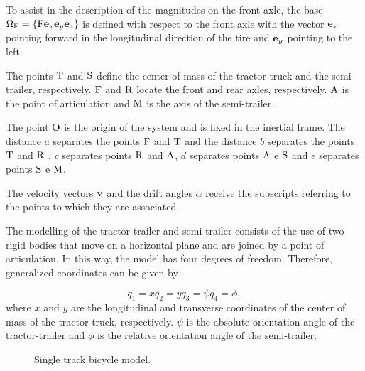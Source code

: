 \documentclass[sublist]{fei}
\begin{document}
To assist in the description of the magnitudes on the front axle, the base \( \Omega_{\rm F} = \{ {\rm F} {\bf e}_x {\bf e}_y {\bf e}_z \}\)  is defined with respect to the front axle with the vector  \({\bf e}_x\)pointing forward in the longitudinal direction of the tire and \({\bf e}_y\) pointing to the left.

The points  \({\rm T}\) and \({\rm S}\)  define the center of mass of the tractor-truck and the semi-trailer, respectively. \({\rm F}\) and \({\rm R}\) locate the front and rear axles, respectively. \({\rm A}\)  is the point of articulation and \({\rm M}\) is the axis of the semi-trailer.

The point \({\rm O}\) is the origin of the system and is fixed in the inertial frame. The distance \(a\) separates the points \({\rm F}\) and \({\rm T}\)  and the distance  \(b\) separates the points \({\rm T}\) and \({\rm R}\) .  \(c\) separates points \({\rm R}\) and \({\rm A}\), \(d\) separates points \({\rm A}\) e \({\rm S}\) and  \(e\) separates points \({\rm S}\) e \({\rm M}\). 


The velocity vectors  \({\bf v}\)  and the drift angles \(\alpha\) receive the subscripts referring to the points to which they are associated.
	
The modelling of the tractor-trailer and semi-trailer consists of the use of two rigid bodies that move on a horizontal plane and are joined by a point of articulation. In this way, the model has four degrees of freedom. Therefore, generalized coordinates can be given by

\begin{subequations}
\begin{equation}
    q_1 = x
\end{equation}
\begin{equation}
    q_2 = y
\end{equation}
\begin{equation}
    q_3 = \psi
\end{equation}
\begin{equation}
    q_4 = \phi,
\end{equation}
\end{subequations}
where \(x \) and \(y \) are the longitudinal and transverse coordinates of the center of mass of the tractor-truck, respectively. \(\psi \) is the absolute orientation angle of the tractor-trailer and \(\phi \) is the relative orientation angle of the semi-trailer.
\begin{figure}
    \begin{center}
    \caption{Single track bicycle model.} \label{modelSimple}
    \end{center}
\end{figure}
\end{document}
